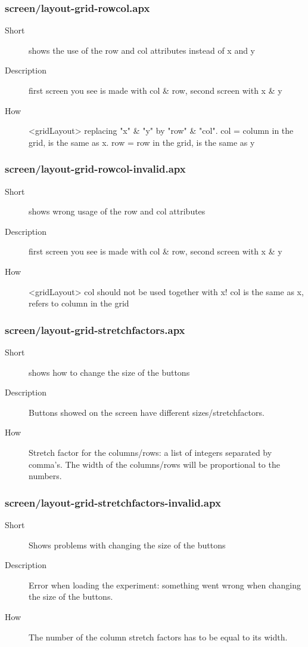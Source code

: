 \subsubsection{screen/layout-grid-rowcol.apx}
\begin{description}
\item[Short] 
 shows the use of the row and col attributes instead of x and y
\item[Description] 
 first screen you see is made with col \& row, second screen with x \& y
\item[How] 
 \textless{}gridLayout\textgreater{} replacing "x" \& "y" by "row" \& "col". col = column in the grid, is the same as x. row = row in the grid, is the same as y
\end{description}

\subsubsection{screen/layout-grid-rowcol-invalid.apx}
\begin{description}
\item[Short] 
 shows wrong usage of the row and col attributes
\item[Description] 
 first screen you see is made with col \& row, second screen with x \& y
\item[How] 
 \textless{}gridLayout\textgreater{} col should not be used together with x! col is the same as x, refers to column in the grid
\end{description}

\subsubsection{screen/layout-grid-stretchfactors.apx}
\begin{description}
\item[Short] 
 shows how to change the size of the buttons
\item[Description] 
 Buttons showed on the screen have different sizes/stretchfactors.
\item[How] 
 Stretch factor for the columns/rows: a list of integers separated by comma's. The width of the columns/rows will be proportional to the numbers.
\end{description}

\subsubsection{screen/layout-grid-stretchfactors-invalid.apx}
\begin{description}
\item[Short] 
 Shows problems with changing the size of the buttons
\item[Description] 
 Error when loading the experiment: something went wrong when changing the size of the buttons.
\item[How] 
 The number of the column stretch factors has to be equal to its width.
\end{description}

